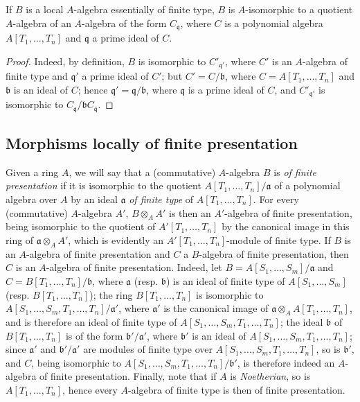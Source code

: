 \begin{proposition}[1.3.11]
\label{IV.1.3.11}
If $B$ is a local $A$-algebra essentially of finite type, $B$ is
$A$-isomorphic to a quotient $A$-algebra of an $A$-algebra of the form
$C_{\mathfrak q}$, where $C$ is a polynomial algebra
$A[T_1,\ldots,T_n]$ and $\mathfrak q$ a prime ideal of $C$.
\end{proposition}

\begin{proof}
Indeed, by definition, $B$ is isomorphic to $C'_{\mathfrak q'}$, where $C'$ is
an $A$-algebra of finite type and $\mathfrak q'$ a prime ideal of $C'$; but
$C'=C/\mathfrak b$, where $C=A[T_1,\ldots,T_n]$ and $\mathfrak b$ is an ideal
of $C$; hence $\mathfrak q'=\mathfrak q/\mathfrak b$, where $\mathfrak q$ is a
prime ideal of $C$, and $C'_{\mathfrak q'}$ is isomorphic to
$C_{\mathfrak q}/\mathfrak bC_{\mathfrak q}$.
\end{proof}

\subsection{Morphisms locally of finite presentation}
\label{subsection:IV.1.4}

\begin{env}[1.4.1]
\label{IV.1.4.1}
Given a ring $A$, we will say that a (commutative) $A$-algebra $B$
is \emph{of finite presentation} if it is isomorphic to the quotient
$A[T_1,\ldots,T_n]/\mathfrak a$ of a polynomial algebra over $A$ by an
ideal $\mathfrak a$ \emph{of finite type} of $A[T_1,\ldots,T_n]$. For every
(commutative) $A$-algebra $A'$, $B\otimes_AA'$ is then an $A'$-algebra of
finite presentation, being isomorphic to the quotient of $A'[T_1,\ldots,T_n]$
by the canonical image in this ring of $\mathfrak a\otimes_AA'$, which is
evidently an $A'[T_1,\ldots,T_n]$-module of finite type. If $B$ is an
$A$-algebra of finite presentation and $C$ a $B$-algebra of finite
presentation, then $C$ is an $A$-algebra of finite presentation. Indeed, let
$B=A[S_1,\ldots,S_m]/\mathfrak a$ and
$C=B[T_1,\ldots,T_n]/\mathfrak b$, where $\mathfrak a$ (resp. $\mathfrak b$) is
an ideal of finite type of $A[S_1,\ldots,S_m]$ (resp.
$B[T_1,\ldots,T_n]$); the ring $B[T_1,\ldots,T_n]$ is isomorphic to
$A[S_1,\ldots,S_m,T_1,\ldots,T_n]/\mathfrak a'$, where $\mathfrak a'$ is
the canonical image of
$\mathfrak a\otimes_AA[T_1,\ldots,T_n]$, and is therefore an ideal of finite
type of $A[S_1,\ldots,S_m,T_1,\ldots,T_n]$; the ideal $\mathfrak b$ of
$B[T_1,\ldots,T_n]$ is of the form $\mathfrak b'/\mathfrak a'$, where
$\mathfrak b'$ is an ideal of $A[S_1,\ldots,S_m,T_1,\ldots,T_n]$; since
$\mathfrak a'$ and $\mathfrak b'/\mathfrak a'$ are modules of finite type
over $A[S_1,\ldots,S_m,T_1,\ldots,T_n]$, so is $\mathfrak b'$,
and $C$, being isomorphic to
$A[S_1,\ldots,S_m,T_1,\ldots,T_n]/\mathfrak b'$, is therefore indeed an
$A$-algebra of finite presentation. Finally, note that if $A$ is
\emph{Noetherian}, so is $A[T_1,\ldots,T_n]$, hence every
$A$-algebra of finite type is then of finite presentation.
\end{env}

